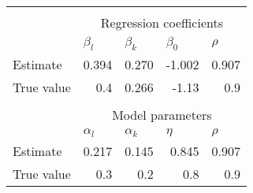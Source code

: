\begin{tabular}{lrrrr}
\toprule
\toprule
          &           &           &           &  \\
          & \multicolumn{4}{c}{Regression coefficients} \\
\cmidrule{2-5}          & \multicolumn{1}{l}{$\beta_l$} & \multicolumn{1}{l}{$\beta_k$} & \multicolumn{1}{l}{$\beta_0$} & \multicolumn{1}{l}{$\rho$} \\
Estimate  & 0.394     & 0.270     & -1.002    & 0.907 \\
True value & 0.4       & 0.266     & -1.13     & 0.9 \\
\midrule
          &           &           &           &  \\
          & \multicolumn{4}{c}{Model parameters} \\
\cmidrule{2-5}          & \multicolumn{1}{l}{$\alpha_l$} & \multicolumn{1}{l}{$\alpha_k$} & \multicolumn{1}{l}{$\eta$} & \multicolumn{1}{l}{$\rho$} \\
\cmidrule{2-5}Estimate  & 0.217     & 0.145     & 0.845     & 0.907 \\
True value & 0.3       & 0.2       & 0.8       & 0.9 \\
\bottomrule
\bottomrule
\end{tabular}%
